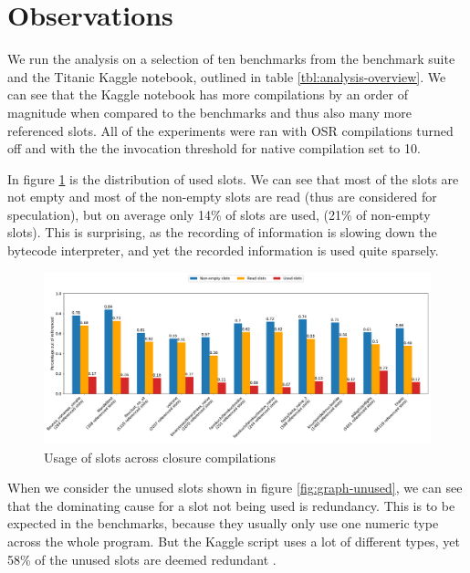 \section{Observations}

We run the analysis on a selection of ten benchmarks from the benchmark suite and the Titanic Kaggle notebook, outlined in table \ref{tbl:analysis-overview}. We can see that the Kaggle notebook has more compilations by an order of magnitude when compared to the benchmarks and thus also many more referenced slots. All of the experiments were ran with OSR compilations turned off and with the the invocation threshold for native compilation set to 10.

In figure \ref{fig:graph-overview} is the distribution of used slots. We can see that most of the slots are not empty and most of the non-empty slots are read (thus are considered for speculation), but on average only 14\% of slots are used, (21\% of non-empty slots). This is surprising, as the recording of information is slowing down the bytecode interpreter, and yet the recorded information is used quite sparsely.

\begin{figure}
	\centering
	\begin{adjustwidth}{-3cm}{-3cm}
		\includegraphics[width=1.5\textwidth]{figures/usage_overall.pdf}
	\end{adjustwidth}
	\caption{Usage of slots across closure compilations}\label{fig:graph-overview}
\end{figure}

When we consider the unused slots shown in figure \ref{fig:graph-unused}, we can see that the dominating cause for a slot not being used is redundancy. This is to be expected in the benchmarks, because they usually only use one numeric type across the whole program. But the Kaggle script uses  a lot of different types, yet 58\% of the unused slots are deemed redundant .

